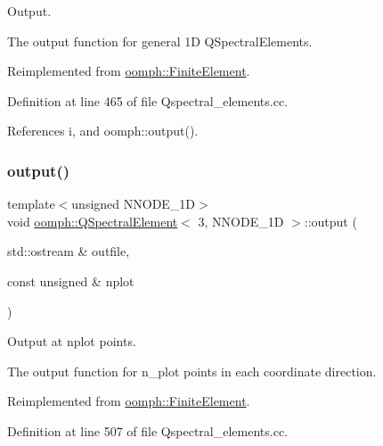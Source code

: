 Output. 

The output function for general 1D Q\+Spectral\+Elements. 

Reimplemented from \hyperlink{classoomph_1_1FiniteElement_a2ad98a3d2ef4999f1bef62c0ff13f2a7}{oomph\+::\+Finite\+Element}.



Definition at line 465 of file Qspectral\+\_\+elements.\+cc.



References i, and oomph\+::output().

\mbox{\label{classoomph_1_1QSpectralElement_3_013_00_01NNODE__1D_01_4_a8e7379b83cec5bf5765e6b5e894cb9cf}} 
\subsubsection{\texorpdfstring{output()}{output()}\hspace{0.1cm}{\footnotesize\ttfamily [4/4]}}
{\footnotesize\ttfamily template$<$unsigned N\+N\+O\+D\+E\+\_\+1D$>$ \\
void \hyperlink{classoomph_1_1QSpectralElement}{oomph\+::\+Q\+Spectral\+Element}$<$ 3, N\+N\+O\+D\+E\+\_\+1D $>$\+::output (\begin{DoxyParamCaption}\item[{std\+::ostream \&}]{outfile,  }\item[{const unsigned \&}]{nplot }\end{DoxyParamCaption})\hspace{0.3cm}{\ttfamily [virtual]}}



Output at nplot points. 

The output function for n\+\_\+plot points in each coordinate direction. 

Reimplemented from \hyperlink{classoomph_1_1FiniteElement_afa9d9b2670f999b43e6679c9dd28c457}{oomph\+::\+Finite\+Element}.



Definition at line 507 of file Qspectral\+\_\+elements.\+cc.



